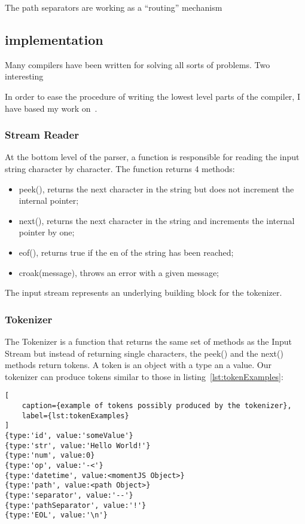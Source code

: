 The path separators are working as a ``routing'' mechanism



\subsection{implementation}

Many compilers have been written for solving all sorts of problems. Two interesting 


In order to ease the procedure of writing the lowest level parts of the compiler, I have based my work on~\cite{bazon16}.

\subsubsection{Stream Reader}

At the bottom level of the parser, a function is responsible for reading the input string character by character. The function returns 4 methods:

\begin{itemize}
    \item peek(), returns the next character in the string but does not increment the internal pointer;
    \item next(), returns the next character in the string and increments the internal pointer by one;
    \item eof(), returns true if the en of the string has been reached;
    \item croak(message), throws an error with a given message;
\end{itemize}

The input stream represents an underlying building block for the tokenizer.

\subsubsection{Tokenizer}

The Tokenizer is a function that returns the same set of methods as the Input Stream but instead of returning single characters, the peek() and the next() methods return tokens. A token is an object with a type an a value. Our tokenizer can produce tokens similar to those in listing~\ref{lst:tokenExamples}:

\begin{lstlisting}[
    caption={example of tokens possibly produced by the tokenizer},
    label={lst:tokenExamples}
]
{type:'id', value:'someValue'}
{type:'str', value:'Hello World!'}
{type:'num', value:0}
{type:'op', value:'-<'}
{type:'datetime', value:<momentJS Object>}
{type:'path', value:<path Object>}
{type:'separator', value:'--'}
{type:'pathSeparator', value:'!'}
{type:'EOL', value:'\n'}
\end{lstlisting}

